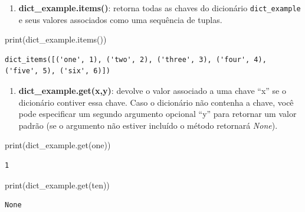 \documentclass[
  brazilian,
  letterpaper,
  DIV=11,
  numbers=noendperiod]{scrreprt}
\newenvironment{Shaded}{\begin{snugshade}}{\end{snugshade}}
\newcommand{\BuiltInTok}[1]{\textcolor[rgb]{0.00,0.23,0.31}{#1}}
\newcommand{\NormalTok}[1]{\textcolor[rgb]{0.00,0.23,0.31}{#1}}
\newcommand{\StringTok}[1]{\textcolor[rgb]{0.13,0.47,0.30}{#1}}
\providecommand{\tightlist}{%
  \setlength{\itemsep}{0pt}\setlength{\parskip}{0pt}}
\begin{document}
\begin{enumerate}
\def\labelenumi{\arabic{enumi}.}
\setcounter{enumi}{2}
\tightlist
\item
  \textbf{dict\_example.items()}: retorna todas as chaves do dicionário
  \texttt{dict\_example} e seus valores associados como uma sequência de
  tuplas.
\end{enumerate}

\begin{Shaded}
\begin{Highlighting}[]
\BuiltInTok{print}\NormalTok{(dict\_example.items())}
\end{Highlighting}
\end{Shaded}

\begin{verbatim}
dict_items([('one', 1), ('two', 2), ('three', 3), ('four', 4), ('five', 5), ('six', 6)])
\end{verbatim}

\begin{enumerate}
\def\labelenumi{\arabic{enumi}.}
\setcounter{enumi}{3}
\tightlist
\item
  \textbf{dict\_example.get(x,y)}: devolve o valor associado a uma chave
  ``x'' se o dicionário contiver essa chave. Caso o dicionário não
  contenha a chave, você pode especificar um segundo argumento opcional
  ``y'' para retornar um valor padrão (se o argumento não estiver
  incluído o método retornará \emph{None}).
\end{enumerate}

\begin{Shaded}
\begin{Highlighting}[]
\BuiltInTok{print}\NormalTok{(dict\_example.get(}\StringTok{\textquotesingle{}one\textquotesingle{}}\NormalTok{))}
\end{Highlighting}
\end{Shaded}

\begin{verbatim}
1
\end{verbatim}

\begin{Shaded}
\begin{Highlighting}[]
\BuiltInTok{print}\NormalTok{(dict\_example.get(}\StringTok{\textquotesingle{}ten\textquotesingle{}}\NormalTok{))}
\end{Highlighting}
\end{Shaded}

\begin{verbatim}
None
\end{verbatim}
\end{document}
